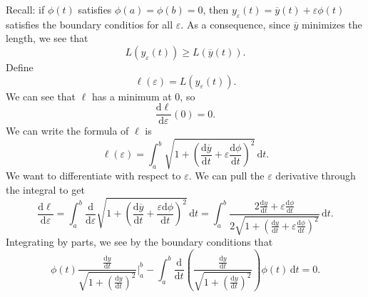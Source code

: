 
Recall: if $\phi (t)$ satisfies $\phi (a)=\phi (b)=0$, then $y_\varepsilon (t)=\overline{y} (t)+\varepsilon \phi (t)$ satisfies the boundary conditios for all $\varepsilon $. As a consequence, since $\overline{y} $ minimizes the length, we see that
\[
	L(y_\varepsilon(t))\geq L(\overline{y}(t) )
.\]
Define
\[
	\ell (\varepsilon )=L(y_\varepsilon(t))
.\]
We can see that $\ell $ has a minimum at $0$, so
\[
	\frac{\mathrm{d}\ell }{\mathrm{d}\varepsilon } (0)=0
.\]
We can write the formula of $\ell $ is
\[
	\ell (\varepsilon )=\int_{a}^{b} \sqrt{1+\left( \frac{\mathrm{d}\overline{y} }{\mathrm{d}t} +\varepsilon \frac{\mathrm{d}\phi }{\mathrm{d}t}  \right) ^2}  \,\mathrm{d} t
.\]
We want to differentiate with respect to $\varepsilon $. We can pull the $\varepsilon $ derivative through the integral to get
\[
	\frac{\mathrm{d}\ell }{\mathrm{d}\varepsilon } =\int_{a}^{b} \frac{\mathrm{d}}{\mathrm{d}\varepsilon } \sqrt{1+\left( \frac{\mathrm{d}\overline{y} }{\mathrm{d}t}+\frac{\varepsilon \mathrm{d}\phi }{\mathrm{d}t}   \right) ^2 } \,\mathrm{d} t=\int_{a}^{b} \frac{2 \frac{\mathrm{d}y}{\mathrm{d}t} +\varepsilon \frac{\mathrm{d}\phi }{\mathrm{d}t} }{2\sqrt{1+ \left(\frac{\mathrm{d}y}{\mathrm{d}t} +\varepsilon \frac{\mathrm{d}\phi }{\mathrm{d}t}  \right) ^2} } \,\mathrm{d} t
.\]
Integrating by parts, we see by the boundary conditions that
\[
	\phi (t) \frac{\frac{\mathrm{d}y}{\mathrm{d}t} }{\sqrt{1+\left( \frac{\mathrm{d}y}{\mathrm{d}t}  \right) ^2} }\bigg\vert_{a}^{b} - \int_{a}^{b} \frac{\mathrm{d}}{\mathrm{d}t} \left( \frac{\frac{\mathrm{d}y}{\mathrm{d}t} }{\sqrt{1+\left( \frac{\mathrm{d}y}{\mathrm{d}t}  \right) ^2} } \right) \phi  (t) \,\mathrm{d} t=0
.\]

